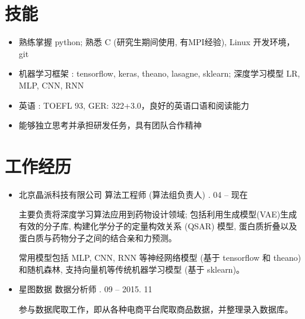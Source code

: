 \documentclass[letterpaper,11pt]{article}
\begin{document}
\section{技能}
\begin{itemize}
\item 熟练掌握 python; 熟悉 C (研究生期间使用, 有MPI经验),  Linux 开发环境，git
\item 机器学习框架 : tensorflow, keras, theano, lasagne, sklearn; \quad 深度学习模型 LR, MLP, CNN, RNN
\item 英语 : TOEFL 93, GER: 322+3.0，良好的英语口语和阅读能力
\item 能够独立思考并承担研发任务，具有团队合作精神
\end{itemize}

\section{工作经历}

\begin{itemize}

\item 北京晶派科技有限公司 \qquad 算法工程师 (算法组负责人) . 04 -- 现在

    主要负责将深度学习算法应用到药物设计领域; 包括利用生成模型(VAE)生成有效的分子库, 构建化学分子的定量构效关系 (QSAR) 模型,
    蛋白质折叠以及蛋白质与药物分子之间的结合亲和力预测。
    
常用模型包括 MLP, CNN, RNN 等神经网络模型 (基于 tensorflow 和 theano) 和随机森林, 支持向量机等传统机器学习模型 (基于 sklearn)。


\item 星图数据 \qquad 数据分析师 . 09 -- 2015. 11

参与数据爬取工作，即从各种电商平台爬取商品数据，并整理录入数据库。

\end{itemize}
\end{document}
